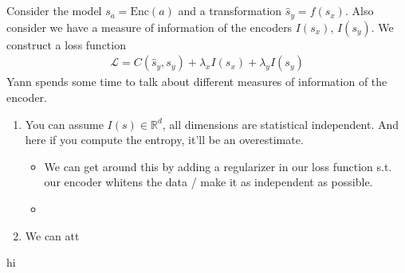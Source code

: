 \subsection{}
Consider the model $s_a = \text{Enc}(a)$ and a transformation $\hat s_y = f(s_x)$. Also consider we have a measure of information of the encoders $I(s_x)$, $I(s_y)$. We construct a loss function
\begin{align}
	\mathcal L = C(\hat s_y, s_y) + \lambda_x I(s_x) + \lambda_y I(s_y)
\end{align}
Yann spends some time to talk about different measures of information of the encoder. 
\begin{enumerate}
	\item You can assume $I(s) \in \mathbb R^d$, all dimensions are statistical independent. And here if you compute the entropy, it'll be an overestimate. 
	\begin{itemize}
		\item We can get around this by adding a regularizer in our loss function s.t. our encoder whitens the data / make it as independent as possible. \
		\item 
	\end{itemize}
	\item We can att
\end{enumerate}






























\newpage
hi















